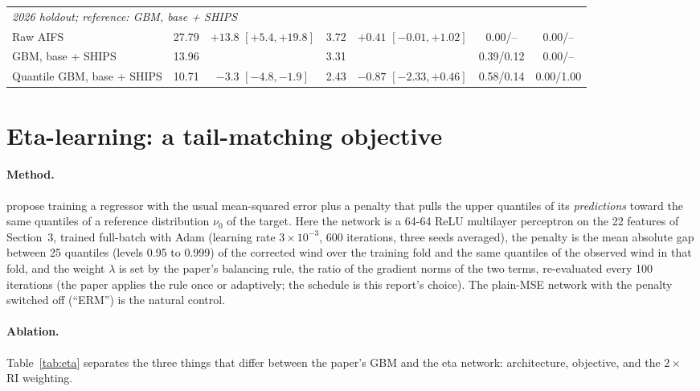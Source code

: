 \documentclass[11pt]{article}
\begin{document}
\begin{table}[t]
{\begin{tabular}{lcccccc}
\midrule
\multicolumn{7}{l}{\emph{2026 holdout; reference: GBM, base + SHIPS}} \\
Raw AIFS                   & 27.79 & $+13.8$ $[+5.4, +19.8]$  & 3.72 & $+0.41$ $[-0.01, +1.02]$ & 0.00/-- & 0.00/-- \\
GBM, base + SHIPS          & 13.96 &                          & 3.31 &                          & 0.39/0.12 & 0.00/-- \\
Quantile GBM, base + SHIPS & 10.71 & $-3.3$ $[-4.8, -1.9]$    & 2.43 & $-0.87$ $[-2.33, +0.46]$ & 0.58/0.14 & 0.00/1.00 \\
\bottomrule
\end{tabular}}
\end{table}

\section{Eta-learning: a tail-matching objective}\label{sec:eta}

\paragraph{Method.} \citet{chang2026eta} propose training a regressor with the usual mean-squared
error plus a penalty that pulls the upper quantiles of its \emph{predictions} toward the same
quantiles of a reference distribution $\nu_0$ of the target. Here the network is a 64-64 ReLU
multilayer perceptron on the 22 features of Section~3, trained full-batch with Adam
(learning rate $3\times10^{-3}$, 600 iterations, three seeds averaged), the penalty is the mean
absolute gap between 25 quantiles (levels 0.95 to 0.999) of the corrected wind over the training
fold and the same quantiles of the observed wind in that fold, and the weight $\lambda$ is set
by the paper's balancing rule, the ratio of the gradient norms of the two terms, re-evaluated
every 100 iterations (the paper applies the rule once or adaptively; the schedule is this
report's choice). The
plain-MSE network with the penalty switched off (``ERM'') is the natural control.

\paragraph{Ablation.} Table~\ref{tab:eta} separates the three things that differ between the
paper's GBM and the eta network: architecture, objective, and the $2\times$ RI weighting.
\end{document}
